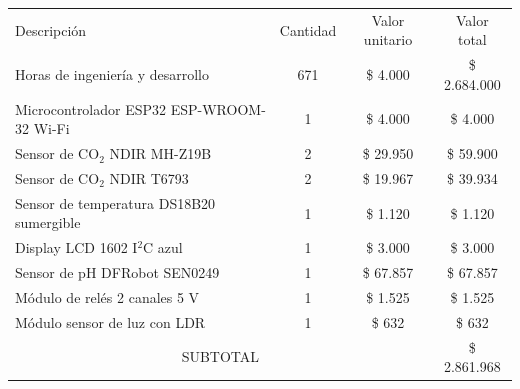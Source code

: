 \documentclass[
11pt, %
]{charter}
\begin{document}
\begin{table}[htpb]
\centering
\begin{tabularx}{\linewidth}{@{}|X|c|r|r|@{}}
\hline
\rowcolor[HTML]{C0C0C0} 
\multicolumn{4}{|c|}{\cellcolor[HTML]{C0C0C0}COSTOS DIRECTOS} \\ \hline
\rowcolor[HTML]{C0C0C0} 
Descripción &
  \multicolumn{1}{c|}{\cellcolor[HTML]{C0C0C0}Cantidad} &
  \multicolumn{1}{c|}{\cellcolor[HTML]{C0C0C0}Valor unitario} &
  \multicolumn{1}{c|}{\cellcolor[HTML]{C0C0C0}Valor total} \\ \hline
  \multicolumn{1}{|l|}{Horas de ingeniería y desarrollo}  &
  \multicolumn{1}{c|}{671} &
  \multicolumn{1}{c|}{\$ 4.000} &
  \multicolumn{1}{c|}{\$ 2.684.000} \\ \hline
  \multicolumn{1}{|l|}{Microcontrolador ESP32 ESP-WROOM-32 Wi-Fi} &
  \multicolumn{1}{c|}{1} &
  \multicolumn{1}{c|}{\$ 4.000} &
  \multicolumn{1}{c|}{\$ 4.000} \\ \hline
  \multicolumn{1}{|l|}{Sensor de CO$_2$ NDIR MH-Z19B} &
  \multicolumn{1}{c|}{2} &
  \multicolumn{1}{c|}{\$ 29.950} &
  \multicolumn{1}{c|}{\$ 59.900} \\ \hline
  \multicolumn{1}{|l|}{Sensor de CO$_2$ NDIR T6793} &
  \multicolumn{1}{c|}{2} &
  \multicolumn{1}{c|}{\$ 19.967} &
  \multicolumn{1}{c|}{\$ 39.934} \\ \hline
  \multicolumn{1}{|l|}{Sensor de temperatura DS18B20 sumergible} &
  \multicolumn{1}{c|}{1} &
  \multicolumn{1}{c|}{\$ 1.120} &
  \multicolumn{1}{c|}{\$ 1.120} \\ \hline
  \multicolumn{1}{|l|}{Display LCD 1602 I$^2$C azul} &
  \multicolumn{1}{c|}{1} &
  \multicolumn{1}{c|}{\$ 3.000} &
  \multicolumn{1}{c|}{\$ 3.000} \\ \hline
  \multicolumn{1}{|l|}{Sensor de pH DFRobot SEN0249} &
  \multicolumn{1}{c|}{1} &
  \multicolumn{1}{c|}{\$ 67.857} &
  \multicolumn{1}{c|}{\$ 67.857} \\ \hline
  \multicolumn{1}{|l|}{Módulo de relés 2 canales 5 V} &
  \multicolumn{1}{c|}{1} &
  \multicolumn{1}{c|}{\$ 1.525} &
  \multicolumn{1}{c|}{\$ 1.525} \\ \hline
  \multicolumn{1}{|l|}{Módulo sensor de luz con LDR} &
  \multicolumn{1}{c|}{1} &
  \multicolumn{1}{c|}{\$ 632} &
  \multicolumn{1}{c|}{\$ 632} \\ \hline
\multicolumn{3}{|c|}{SUBTOTAL} &
  \multicolumn{1}{c|}{\$ 2.861.968} \\ \hline

\end{tabularx}
\end{table}
\end{document}
